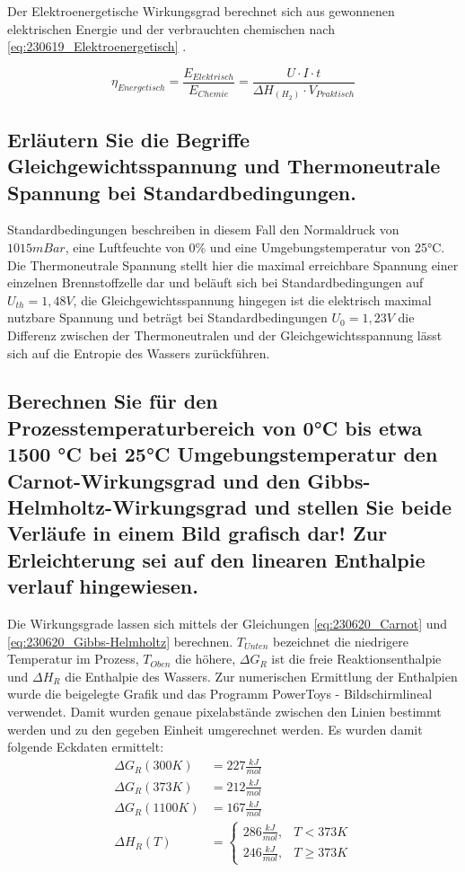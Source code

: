 Der Elektroenergetische Wirkungsgrad berechnet sich aus gewonnenen elektrischen Energie und der verbrauchten chemischen nach \autoref{eq:230619_Elektroenergetisch} \cite{BZ-Folien}.

\begin{equation}
    \eta_{Energetisch} = \frac{E_{Elektrisch}}{E_{Chemie}} = \frac{U \cdot I \cdot t}{\Delta H_{(H_2)} \cdot V_{Praktisch}}
    \label{eq:230619_Elektroenergetisch}
\end{equation}

\subsection{Erläutern Sie die Begriffe Gleichgewichtsspannung und Thermoneutrale Spannung bei Standardbedingungen.}

Standardbedingungen beschreiben in diesem Fall den Normaldruck von $1015mBar$, eine Luftfeuchte von $0\%$ und eine Umgebungstemperatur von 25°C.
Die Thermoneutrale Spannung stellt hier die maximal erreichbare Spannung einer einzelnen Brennstoffzelle dar und beläuft sich bei Standardbedingungen auf $U_{th} = 1,48V$, 
die Gleichgewichtsspannung hingegen ist die elektrisch maximal nutzbare Spannung und beträgt bei Standardbedingungen $U_0 = 1,23V$ die Differenz zwischen der Thermoneutralen und der Gleichgewichtsspannung lässt sich auf die Entropie des Wassers zurückführen.   

\subsection{Berechnen Sie für den Prozesstemperaturbereich von 0°C bis etwa 1500 °C bei 25°C
Umgebungstemperatur den Carnot-Wirkungsgrad und den Gibbs-Helmholtz-Wirkungsgrad
und stellen Sie beide Verläufe in einem Bild grafisch dar! Zur Erleichterung sei auf den
linearen Enthalpie verlauf hingewiesen.}

Die Wirkungsgrade lassen sich mittels der Gleichungen \ref{eq:230620_Carnot} und \ref{eq:230620_Gibbs-Helmholtz} berechnen. 
$T_{Unten}$ bezeichnet die niedrigere Temperatur im Prozess, $T_{Oben}$ die höhere, $\Delta G_R$ ist die freie Reaktionsenthalpie und $\Delta H_R$ die Enthalpie des Wassers.
Zur numerischen Ermittlung der Enthalpien wurde die beigelegte Grafik und das Programm PowerToys - Bildschirmlineal verwendet.
Damit wurden genaue pixelabstände zwischen den Linien bestimmt werden und zu den gegeben Einheit umgerechnet werden.
Es wurden damit folgende Eckdaten ermittelt:
\begin{align}
    \Delta G_R(300K) &= 227 \frac{kJ}{mol} \nonumber\\
    \Delta G_R(373K) &= 212 \frac{kJ}{mol} \nonumber\\
    \Delta G_R(1100K) &= 167 \frac{kJ}{mol} \nonumber\\
    \Delta H_R(T) &= 
        \begin{cases}
            286 \frac{kJ}{mol}, & T < 373 K \\
            246 \frac{kJ}{mol}, & T \geq 373 K
        \end{cases} \nonumber
\end{align}

